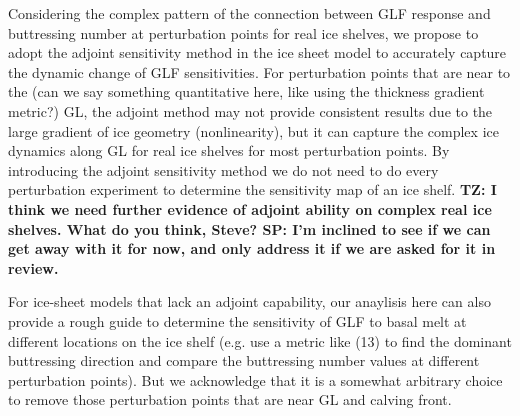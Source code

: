 \documentclass[tc, manuscript]{copernicus}
\begin{document}
Considering the complex pattern of the connection between GLF response and buttressing number at perturbation points for real ice shelves, we propose to adopt the adjoint sensitivity method in the ice sheet model to accurately capture the dynamic change of GLF sensitivities. For perturbation points that are near to the (can we say something quantitative here, like using the thickness gradient metric?) GL, the adjoint method may not provide consistent results due to the large gradient of ice geometry (nonlinearity), but it can capture the complex ice dynamics along GL for real ice shelves for most perturbation points. By introducing the adjoint sensitivity method we do not need to do every perturbation experiment to determine the sensitivity map of an ice shelf. \textbf{TZ: I think we need further evidence of adjoint ability on complex real ice shelves. What do you think, Steve? SP: I'm inclined to see if we can get away with it for now, and only address it if we are asked for it in review.}

For ice-sheet models that lack an adjoint capability, our anaylisis here can also provide a rough guide to determine the sensitivity of GLF to basal melt at different locations on the ice shelf (e.g. use a metric like (13) to find the dominant buttressing direction and compare the buttressing number values at different perturbation points). But we acknowledge that it is a somewhat arbitrary choice to remove those perturbation points that are near GL and calving front.


\end{document}
